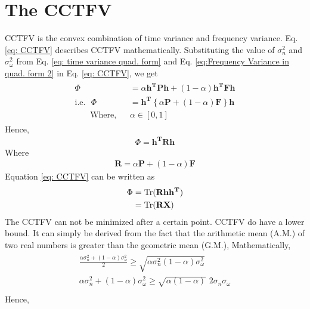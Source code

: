 \section{The CCTFV}
\label{sec: CCTFV}
CCTFV is the convex combination of time variance and frequency variance. Eq. \ref{eq: CCTFV} describes CCTFV mathematically. Substituting the value of $\sigma_n^2$ and $\sigma_{\omega}^{2}$  from Eq. \ref{eq: time variance quad. form} and Eq. \ref{eq:Frequency Variance in quad. form 2} in Eq. \ref{eq: CCTFV}, we get
\begin{eqnarray*}
\begin{aligned}
\Phi &= \alpha \mathbf{h^TPh}  + (1 - \alpha) \mathbf{h^TFh} \\
\text{i.e.} \,\,\,\,
\Phi &= \mathbf{h^T} \left\{\alpha \mathbf{P}  + (1 - \alpha) \mathbf{F}\right\}\mathbf{h}\\
\,\,\,\,\,\,\,\,\,\,\, \text{Where,} \,\,\,\,\,
& \alpha \in [0,1]
\end{aligned}
\end{eqnarray*}
Hence,
\begin{eqnarray}
\label{eq: CCTFV in quad. form}
\Phi = \mathbf{h^TRh}
\end{eqnarray}
Where 
\begin{eqnarray}
\label{eq: matrix R}
\mathbf{R} = \alpha \mathbf{P}  + (1 - \alpha) \mathbf{F}
\end{eqnarray}
Equation \ref{eq: CCTFV} can be written as 
\begin{eqnarray}
\label{eq: CCTFV trace form}
\begin{aligned}
\Phi &= \operatorname{Tr}(\mathbf{Rh{h^T}})\\
       &= \operatorname{Tr}(\mathbf{RX})    
\end{aligned}
\end{eqnarray}
The CCTFV can not be minimized after a certain point. CCTFV do have a lower bound. It can simply be derived from the fact that the arithmetic mean (A.M.) of two real numbers is greater than the geometric mean (G.M.), Mathematically,
\begin{eqnarray}
\begin{aligned}
\frac{\alpha  \sigma_n^2 + (1-\alpha) \sigma_\omega^2}{2} \geq \sqrt{\alpha  \sigma_n^2 (1-\alpha)\sigma_\omega^2}\\
\alpha  \sigma_n^2 + (1-\alpha) \sigma_\omega^2 \geq \sqrt{\alpha(1-\alpha)}\,\,2\sigma_n \sigma_\omega\\
\end{aligned}
\end{eqnarray}
Hence,
